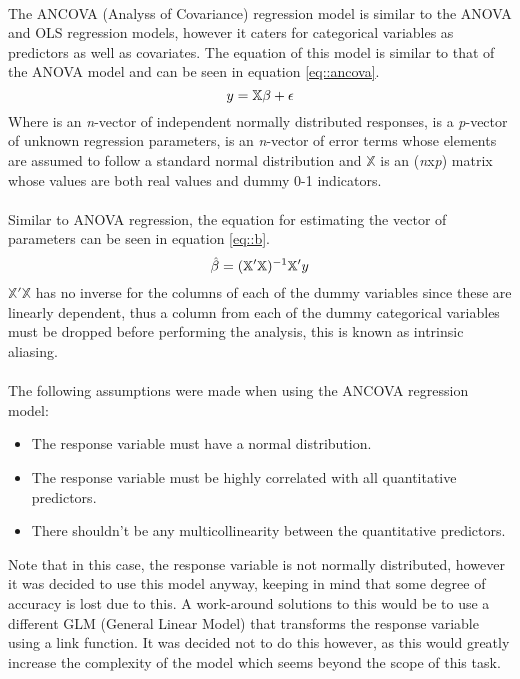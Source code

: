 \paragraph{ }The ANCOVA (Analyss of Covariance) regression model is similar to the ANOVA and OLS regression models, however it caters for categorical variables as predictors as well as covariates. The equation of this model is similar to that of the ANOVA model and can be seen in equation \ref{eq::ancova}.
\begin{equation}
\centering
\boldmath{y}=\mathbb{X}\boldmath{\beta}+\boldmath{\epsilon}
\label{eq::ancova}
\end{equation}
Where  is an \textit{n}-vector of independent normally distributed responses, \boldmath{$\beta$} is a \textit{p}-vector of unknown regression parameters, \boldmath{$\epsilon$} is an \textit{n}-vector of error terms whose elements are assumed to follow a standard normal distribution and $\mathbb{X}$ is an (\textit{n}x\textit{p}) matrix whose values are both real values and dummy 0-1 indicators.

\paragraph{ }Similar to ANOVA regression, the equation for estimating the vector of parameters can be seen in equation \ref{eq::b}.
\begin{equation}
\centering
\boldmath{\hat{\beta}}=(\mathbb{X'X})^{-1}\mathbb{X}'\boldmath{y}
\label{eq::b}
\end{equation}
$\mathbb{X'X}$ has no inverse for the columns of each of the dummy variables since these are linearly dependent, thus a column from each of the dummy categorical variables must be dropped before performing the analysis, this is known as intrinsic aliasing.

\paragraph{ }The following assumptions were made when using the ANCOVA regression model:
\begin{itemize}
	\item The response variable must have a normal distribution.
	\item The response variable must be highly correlated with all quantitative predictors.
	\item There shouldn't be any multicollinearity between the quantitative predictors.
\end{itemize} 
Note that in this case, the response variable is not normally distributed, however it was decided to use this model anyway, keeping in mind that some degree of accuracy is lost due to this. A work-around solutions to this would be to use a different GLM (General Linear Model) that transforms the response variable using a link function. It was decided not to do this however, as this would greatly increase the complexity of the model which seems beyond the scope of this task.

